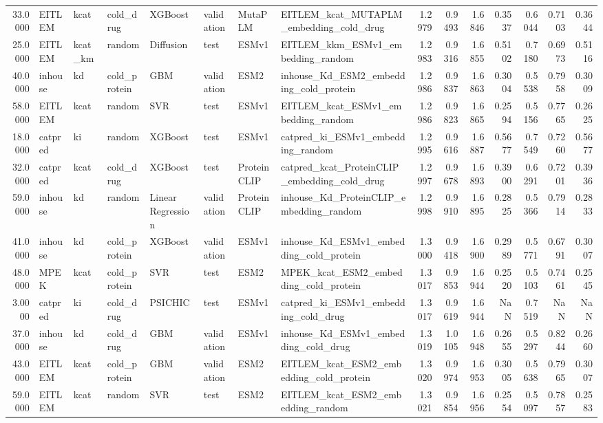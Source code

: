 \begin{tabular}{rlllllllrrrrrrr}
33.0000 & EITLEM & kcat & cold_drug & XGBoost & validation & MutaPLM & EITLEM_kcat_MUTAPLM_embedding_cold_drug & 1.2979 & 0.9493 & 1.6846 & 0.3537 & 0.6044 & 0.7103 & 0.3644 \\
25.0000 & EITLEM & kcat_km & random & Diffusion & test & ESMv1 & EITLEM_kkm_ESMv1_embedding_random & 1.2983 & 0.9316 & 1.6855 & 0.5102 & 0.7180 & 0.6973 & 0.5116 \\
40.0000 & inhouse & kd & cold_protein & GBM & validation & ESM2 & inhouse_Kd_ESM2_embedding_cold_protein & 1.2986 & 0.9837 & 1.6863 & 0.3004 & 0.5538 & 0.7958 & 0.3009 \\
58.0000 & EITLEM & kcat & random & SVR & test & ESMv1 & EITLEM_kcat_ESMv1_embedding_random & 1.2986 & 0.9823 & 1.6865 & 0.2594 & 0.5156 & 0.7765 & 0.2625 \\
18.0000 & catpred & ki & random & XGBoost & test & ESMv1 & catpred_ki_ESMv1_embedding_random & 1.2995 & 0.9616 & 1.6887 & 0.5677 & 0.7549 & 0.7260 & 0.5677 \\
32.0000 & catpred & kcat & cold_drug & XGBoost & test & ProteinCLIP & catpred_kcat_ProteinCLIP_embedding_cold_drug & 1.2997 & 0.9678 & 1.6893 & 0.3900 & 0.6291 & 0.7201 & 0.3936 \\
59.0000 & inhouse & kd & random & Linear Regression & validation & ProteinCLIP & inhouse_Kd_ProteinCLIP_embedding_random & 1.2998 & 0.9910 & 1.6895 & 0.2825 & 0.5366 & 0.7914 & 0.2833 \\
41.0000 & inhouse & kd & cold_protein & XGBoost & validation & ESMv1 & inhouse_Kd_ESMv1_embedding_cold_protein & 1.3000 & 0.9418 & 1.6900 & 0.2989 & 0.5771 & 0.6791 & 0.3007 \\
48.0000 & MPEK & kcat & cold_protein & SVR & test & ESM2 & MPEK_kcat_ESM2_embedding_cold_protein & 1.3017 & 0.9853 & 1.6944 & 0.2520 & 0.5103 & 0.7461 & 0.2545 \\
3.0000 & catpred & ki & cold_drug & PSICHIC & test & ESMv1 & catpred_ki_ESMv1_embedding_cold_drug & 1.3017 & 0.9619 & 1.6944 & NaN & 0.7519 & NaN & NaN \\
37.0000 & inhouse & kd & cold_drug & GBM & validation & ESMv1 & inhouse_Kd_ESMv1_embedding_cold_drug & 1.3019 & 1.0105 & 1.6948 & 0.2655 & 0.5297 & 0.8244 & 0.2660 \\
43.0000 & EITLEM & kcat & cold_protein & GBM & validation & ESM2 & EITLEM_kcat_ESM2_embedding_cold_protein & 1.3020 & 0.9974 & 1.6953 & 0.3005 & 0.5638 & 0.7965 & 0.3007 \\
59.0000 & EITLEM & kcat & random & SVR & test & ESM2 & EITLEM_kcat_ESM2_embedding_random & 1.3021 & 0.9854 & 1.6956 & 0.2554 & 0.5097 & 0.7857 & 0.2583 \\

\end{tabular}
